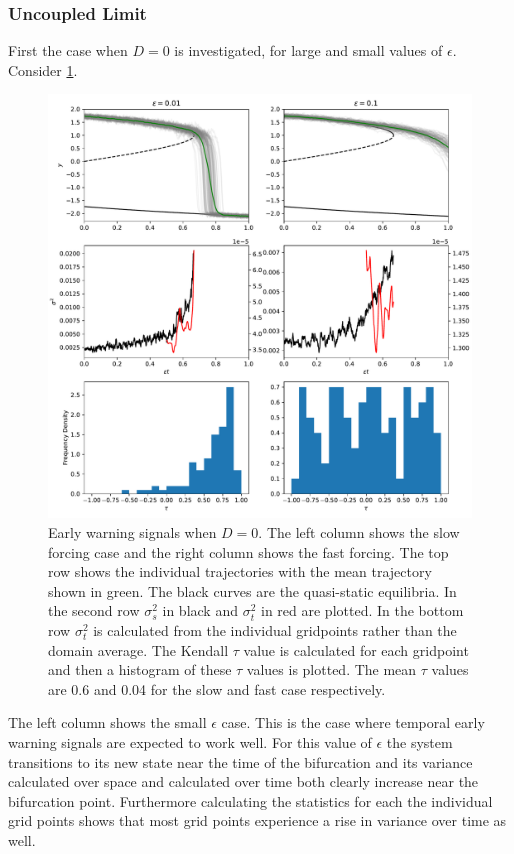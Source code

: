 \subsubsection{Uncoupled Limit}
First the case  when $D = 0$ is investigated, for large and small values of $\epsilon$. Consider \cref{fig:uncoupled_timeseries}.
\begin{figure}
  \centering
  \includegraphics[width=\textwidth,keepaspectratio]{uncoupled_variance}
  \caption[Early warning signals in the uncoupled limit]{Early warning signals when $D = 0$. The left column shows the slow forcing case and the right column shows the fast forcing.
    The top row shows the individual trajectories with the mean trajectory shown in green. The black curves are the quasi-static equilibria.
    In the second row  $\sigma_s^2$ in black and $\sigma_t^2$ in red are plotted. In the bottom row $\sigma_t^2$ is calculated from the individual gridpoints
    rather than the domain average.  The Kendall $\tau$ value is calculated for each gridpoint and then a histogram of these $\tau$ values is plotted. The mean $\tau$ values
    are 0.6 and 0.04 for the slow and fast case respectively.}
  \label{fig:uncoupled_timeseries}
\end{figure}
The left column shows the small $\epsilon$ case. This is the case
where temporal early warning signals are expected to work well. For this value of $\epsilon$ the system
transitions to its new state near the time of the bifurcation and its variance calculated over
space and calculated over time both clearly increase near the bifurcation point. Furthermore
calculating the statistics for each the individual grid points shows that most grid points 
experience a rise in variance over time as well.

